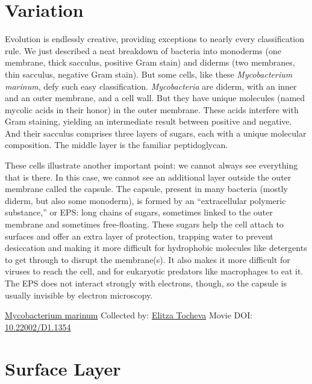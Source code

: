 \documentclass[]{tufte-book}
\begin{document}
\hypertarget{variation}{%
\section{Variation}\label{variation}}

Evolution is endlessly creative, providing exceptions to nearly every classification rule. We just described a neat breakdown of bacteria into monoderms (one membrane, thick sacculus, positive Gram stain) and diderms (two membranes, thin sacculus, negative Gram stain). But some cells, like these \emph{Mycobacterium marinum}, defy such easy classification. \emph{Mycobacteria} are diderm, with an inner and an outer membrane, and a cell wall. But they have unique molecules (named mycolic acids in their honor) in the outer membrane. These acids interfere with Gram staining, yielding an intermediate result between positive and negative. And their sacculus comprises three layers of sugars, each with a unique molecular composition. The middle layer is the familiar peptidoglycan.

These cells illustrate another important point: we cannot always see everything that is there. In this case, we cannot see an additional layer outside the outer membrane called the capsule. The capsule, present in many bacteria (mostly diderm, but also some monoderm), is formed by an ``extracellular polymeric substance,'' or EPS: long chains of sugars, sometimes linked to the outer membrane and sometimes free-floating. These sugars help the cell attach to surfaces and offer an extra layer of protection, trapping water to prevent desiccation and making it more difficult for hydrophobic molecules like detergents to get through to disrupt the membrane(s). It also makes it more difficult for viruses to reach the cell, and for eukaryotic predators like macrophages to eat it. The EPS does not interact strongly with electrons, though, so the capsule is usually invisible by electron microscopy.



\hypertarget{htmlwidget-9ca3b8e900d5e75ec975}{}

\label{fig:2-5}\protect\hyperlink{tree}{Mycobacterium marinum} Collected by: \protect\hyperlink{elitza_tocheva}{Elitza Tocheva} Movie DOI: \href{https://doi.org/10.22002/D1.1354}{10.22002/D1.1354}

\hypertarget{surface-layer}{%
\section{Surface Layer}\label{surface-layer}}
\end{document}
